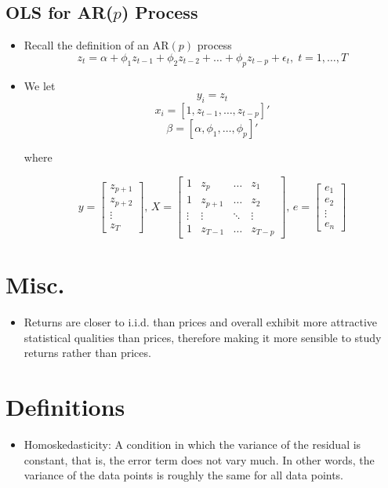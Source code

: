 \documentclass[11pt]{article}
\begin{document}
\subsection{OLS for AR($p$) Process}
\begin{itemize}
    \item Recall the definition of an $\text{AR}(p)$ process 
    \[z_t = \alpha + \phi_1 z_{t-1} + \phi_2 z_{t-2} + \hdots + \phi_p z_{t-p} + \epsilon_t , 
    \; t = 1, \ldots, T\]
    \item We let 
    \[y_i = z_t\]
    \[x_i= [1, z_{t-1}, \ldots, z_{t-p}]'\]
    \[\beta = [\alpha, \phi_1, \ldots, \phi_p]'\]

    where 

    \[
    y = \begin{bmatrix}
        z_{p+1} \\
        z_{p+2} \\
        \vdots \\
        z_T
    \end{bmatrix}, \,
    X = \begin{bmatrix}
        1 & z_p & \hdots & z_1 \\
        1 & z_{p+1} & \hdots & z_2 \\
        \vdots & \vdots & \ddots & \vdots \\
        1 & z_{T-1} & \hdots & z_{T-p}
    \end{bmatrix}, \, 
    e = \begin{bmatrix}
        e_1 \\
        e_2 \\
        \vdots \\
        e_n
    \end{bmatrix}
    \]
\end{itemize}



\section{Misc.}
\begin{itemize}
    \item Returns are closer to i.i.d. than prices and overall exhibit more attractive 
    statistical qualities than prices, therefore making it more sensible to study returns 
    rather than prices. 
\end{itemize}

\section{Definitions}
\begin{itemize}
    \item Homoskedasticity: A condition in which the variance of the residual is constant, that
    is, the error term does not vary much. In other words, the variance of the data points is 
    roughly the same for all data points. 
\end{itemize}
\end{document}
